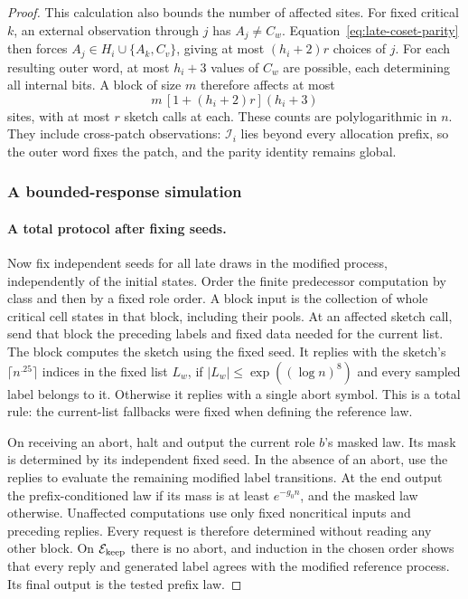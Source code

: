 \begin{proof}
This calculation also bounds the number of affected sites. For fixed
critical \(k\), an external observation through \(j\) has
\(A_j\ne C_w\). Equation~\eqref{eq:late-coset-parity} then forces
\(A_j\in H_i\cup\{A_k,C_v\}\), giving at most \((h_i+2)r\)
choices of \(j\). For each resulting outer word, at most \(h_i+3\)
values of \(C_w\) are possible, each determining all internal bits.
A block of size \(m\) therefore affects at most
\[
 m\,[1+(h_i+2)r](h_i+3)
\]
sites, with at most \(r\) sketch calls at each. These counts are
polylogarithmic in \(n\). They include cross-patch observations:
\(\mathcal I_i\) lies beyond every allocation prefix, so the outer
word fixes the patch, and the parity identity remains global.

\subsubsection{A bounded-response simulation}
\label{sec:a-bounded-response-simulation}

\paragraph{A total protocol after fixing seeds.}
Now fix independent seeds for all late draws in the modified process,
independently of the initial states. Order the finite predecessor
computation by class and then by a fixed role order. A block input is
the collection of whole critical cell states in that block, including
their pools. At an affected sketch call, send that block the preceding
labels and fixed data needed for the current list. The block computes
the sketch using the fixed seed. It replies with the sketch's
\(\lceil n^{.25}\rceil\) indices in the fixed list \(L_w\), if
\(|L_w|\le\exp((\log n)^8)\) and every sampled label belongs to it.
Otherwise it replies with a single abort symbol. This is a total rule:
the current-list fallbacks were fixed when defining the reference law.

On receiving an abort, halt and output the current role \(b\)'s
masked law. Its mask is determined by its independent fixed seed. In
the absence of an abort, use the replies to evaluate the remaining
modified label transitions. At the end output the prefix-conditioned
law if its mass is at least \(e^{-g_0n}\), and the masked law otherwise.
Unaffected computations use only fixed noncritical inputs and preceding
replies. Every request is therefore determined without reading any
other block. On \(\mathcal E_{\rm keep}\) there is no abort, and
induction in the chosen order shows that every reply and generated
label agrees with the modified reference process. Its final output is
the tested prefix law.


\end{proof}
